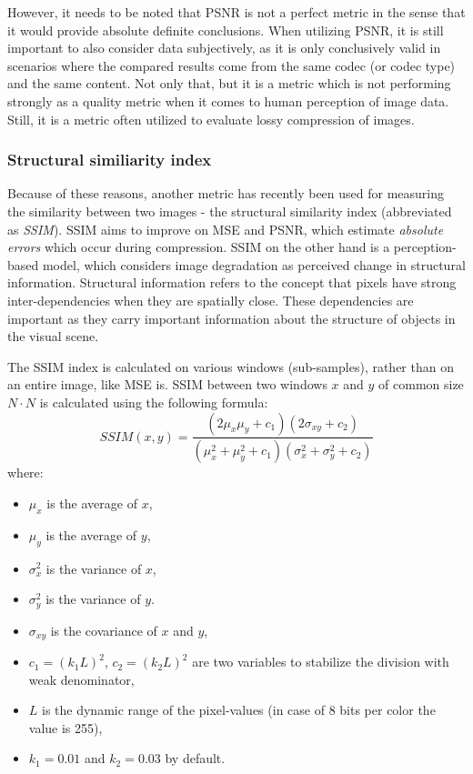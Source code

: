 \documentclass[thesis=M,english]{FITthesis}[2012/10/20]
\begin{document}
However, it needs to be noted that PSNR is not a perfect metric in the sense
that it would provide absolute definite conclusions. When utilizing PSNR, it is
still important to also consider data subjectively, as it is only conclusively
valid in scenarios where the compared results come from the same codec (or codec
type) and the same content. Not only that, but it is a metric which is not
performing strongly as a quality metric when it comes to human perception
of image data.\cite{psnrvalid} Still, it is a metric often
utilized to evaluate lossy compression of images.

\subsubsection{Structural similiarity index}
Because of these reasons, another metric has recently been used for measuring the
similarity between two images - the structural similarity index (abbreviated as
\emph{SSIM}). SSIM aims to improve on MSE and PSNR, which estimate \emph{absolute
errors} which occur during compression. SSIM on the other hand is a perception-based
model, which considers image degradation as perceived change in structural information.
Structural information refers to the concept that pixels have strong inter-dependencies
when they are spatially close. These dependencies are important as they carry important
information about the structure of objects in the visual scene.

The SSIM index is calculated on various windows (sub-samples), rather than on an entire
image, like MSE is. SSIM between two windows $x$ and $y$ of common size $N \cdot N$ is
calculated using the following formula:
\begin{equation}
  SSIM(x, y) = \frac{(2\mu_{x}\mu_{y}+c_{1})(2\sigma_{xy} + c_{2})}{(\mu^{2}_{x} + \mu^{2}_{y} + c_{1})(\sigma^{2}_{x} + \sigma^{2}_{y} + c_2)}
\end{equation}
where:
\begin{itemize}
  \item $\mu_{x}$ is the average of $x$,
  \item $\mu_{y}$ is the average of $y$,
  \item $\sigma^{2}_{x}$ is the variance of $x$,
  \item $\sigma^{2}_{y}$ is the variance of $y$.
  \item $\sigma_{xy}$ is the covariance of $x$ and $y$,
  \item $c_1 = (k_1 L)^{2}$, $c_2 = (k_2 L)^{2}$ are two variables to stabilize
  the division with weak denominator,
  \item $L$ is the dynamic range of the pixel-values (in case of 8 bits per color the value is 255),
  \item $k_1 = 0.01$ and $k_2 = 0.03$ by default.
\end{itemize}\cite{ssim}
\end{document}
